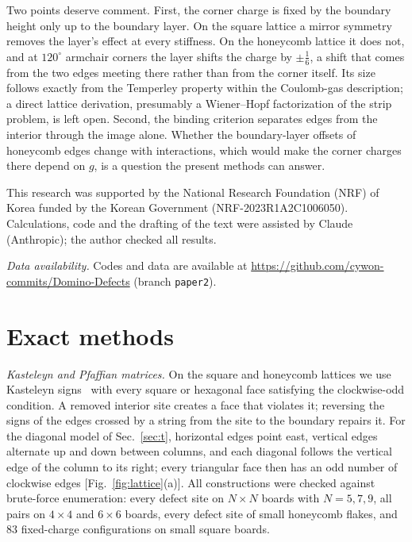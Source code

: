 \documentclass[aps,pre,twocolumn,superscriptaddress,nofootinbib,floatfix]{revtex4-2}
\begin{document}
Two points deserve comment. First, the corner charge is fixed by the boundary height only up to the boundary layer. On the square lattice a mirror symmetry removes the layer's effect at every stiffness. On the honeycomb lattice it does not, and at $120^\circ$ armchair corners the layer shifts the charge by $\pm\tfrac16$, a shift that comes from the two edges meeting there rather than from the corner itself. Its size follows exactly from the Temperley property within the Coulomb-gas description; a direct lattice derivation, presumably a Wiener--Hopf factorization of the strip problem, is left open. Second, the binding criterion separates edges from the interior through the image alone. Whether the boundary-layer offsets of honeycomb edges change with interactions, which would make the corner charges there depend on $g$, is a question the present methods can answer.

\begin{acknowledgments}
This research was supported by the National Research Foundation (NRF) of Korea funded by the Korean Government (NRF-2023R1A2C1006050). Calculations, code and the drafting of the text were assisted by Claude (Anthropic); the author checked all results.
\end{acknowledgments}

\emph{Data availability.} Codes and data are available at \url{https://github.com/cywon-commits/Domino-Defects} (branch \texttt{paper2}).

\appendix
\section{Exact methods}
\label{app:num}
\emph{Kasteleyn and Pfaffian matrices.} On the square and honeycomb lattices we use Kasteleyn signs~\cite{Kasteleyn1961,Kasteleyn1963,TemperleyFisher1961} with every square or hexagonal face satisfying the clockwise-odd condition. A removed interior site creates a face that violates it; reversing the signs of the edges crossed by a string from the site to the boundary repairs it. For the diagonal model of Sec.~\ref{sec:t}, horizontal edges point east, vertical edges alternate up and down between columns, and each diagonal follows the vertical edge of the column to its right; every triangular face then has an odd number of clockwise edges [Fig.~\ref{fig:lattice}(a)]. All constructions were checked against brute-force enumeration: every defect site on $N\times N$ boards with $N=5,7,9$, all pairs on $4\times4$ and $6\times6$ boards, every defect site of small honeycomb flakes, and $83$ fixed-charge configurations on small square boards.
\end{document}
